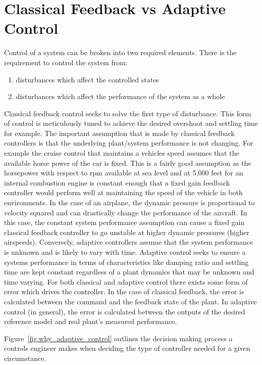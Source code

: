 \section{Classical Feedback vs Adaptive Control}
Control of a system can be broken into two required elements.  There is the requirement to control the system from:
\begin{enumerate}
	\item disturbances which affect the controlled states 
	\item disturbances which affect the performance of the system as a whole
\end{enumerate}
Classical feedback control seeks to solve the first type of disturbance.  This form of control is meticulously tuned to achieve the desired overshoot and settling time for example.  The important assumption that is made by classical feedback controllers is that the underlying plant/system performance is not changing.  For example the cruise control that maintains a vehicles speed assumes that the available horse power of the car is fixed.  This is a fairly good assumption as the horsepower with respect to rpm available at sea level and at 5,000 feet for an internal combustion engine is constant enough that a fixed gain feedback controller would perform well at maintaining the speed of the vehicle in both environments.  In the case of an airplane, the dynamic pressure is proportional to velocity squared and can drastically change the performance of the aircraft.  In this case, the constant system performance assumption can cause a fixed gain classical feedback controller to go unstable at higher dynamic pressures (higher airspeeds).   Conversely, adaptive controllers assume that the system performance is unknown and is likely to vary with time.  Adaptive control seeks to ensure a systems performance in terms of characteristics like damping ratio and settling time are kept constant regardless of a plant dynamics that may be unknown and time varying.  For both classical and adaptive control there exists some form of error which drives the controller.  In the case of classical feedback, the error is calculated between the command and the feedback state of the plant. In adaptive control (in general), the error is calculated between the outputs of the desired reference model and real plant's measured performance.

Figure~\ref{fig:why_adaptive_control} outlines the decision making process a controls engineer makes when deciding the type of controller needed for a given circumstance.

